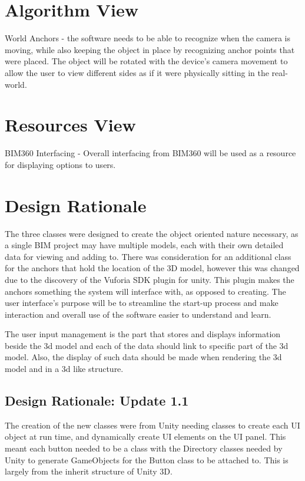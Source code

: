 \documentclass[onecolumn, draftclsnofoot,10pt, compsoc]{IEEEtran}
\begin{document}
\section{Algorithm View}
World Anchors - the software needs to be able to recognize when the camera is moving, while also keeping the object in place by recognizing anchor points that were placed. The object will be rotated with the device's camera movement to allow the user to view different sides as if it were physically sitting in the real-world.

\section{Resources View}
BIM360 Interfacing - Overall interfacing from BIM360 will be used as a resource for displaying options to users.

\section{Design Rationale}
The three classes were designed to create the object oriented nature necessary, as a single BIM project may have multiple models, each with their own detailed data for viewing and adding to. There was consideration for an additional class for the anchors that hold the location of the 3D model, however this was changed due to the discovery of the Vuforia SDK plugin for unity. This plugin makes the anchors something the system will interface with, as opposed to creating. The user interface's purpose will be to streamline the start-up process and make interaction and overall use of the software easier to understand and learn.

The user input management is the part that stores and displays information beside the 3d model and each of the data should link to specific part of the 3d model. Also, the display of such data should be made when rendering the 3d model and in a 3d like structure.\par

\subsection{Design Rationale: Update 1.1}
The creation of the new classes were from Unity needing classes to create each UI object at run time, and dynamically create UI elements on the UI panel.
This meant each button needed to be a class with the Directory classes needed by Unity to generate GameObjects for the Button class to be attached to.
This is largely from the inherit structure of Unity 3D.\par
\end{document}
